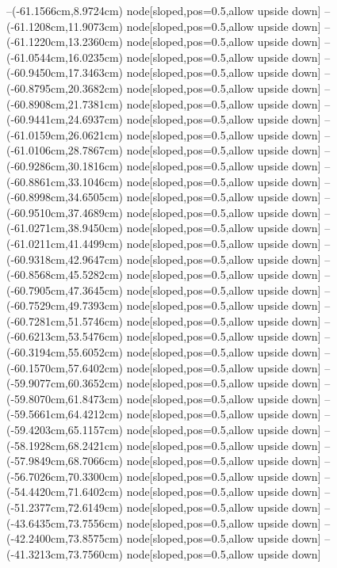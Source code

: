 --(-61.1566cm,8.9724cm) node[sloped,pos=0.5,allow upside down]{\ArrowIn}
--(-61.1208cm,11.9073cm) node[sloped,pos=0.5,allow upside down]{\ArrowIn}
--(-61.1220cm,13.2360cm) node[sloped,pos=0.5,allow upside down]{\ArrowIn}
--(-61.0544cm,16.0235cm) node[sloped,pos=0.5,allow upside down]{\ArrowIn}
--(-60.9450cm,17.3463cm) node[sloped,pos=0.5,allow upside down]{\ArrowIn}
--(-60.8795cm,20.3682cm) node[sloped,pos=0.5,allow upside down]{\ArrowIn}
--(-60.8908cm,21.7381cm) node[sloped,pos=0.5,allow upside down]{\ArrowIn}
--(-60.9441cm,24.6937cm) node[sloped,pos=0.5,allow upside down]{\ArrowIn}
--(-61.0159cm,26.0621cm) node[sloped,pos=0.5,allow upside down]{\ArrowIn}
--(-61.0106cm,28.7867cm) node[sloped,pos=0.5,allow upside down]{\ArrowIn}
--(-60.9286cm,30.1816cm) node[sloped,pos=0.5,allow upside down]{\ArrowIn}
--(-60.8861cm,33.1046cm) node[sloped,pos=0.5,allow upside down]{\ArrowIn}
--(-60.8998cm,34.6505cm) node[sloped,pos=0.5,allow upside down]{\ArrowIn}
--(-60.9510cm,37.4689cm) node[sloped,pos=0.5,allow upside down]{\ArrowIn}
--(-61.0271cm,38.9450cm) node[sloped,pos=0.5,allow upside down]{\ArrowIn}
--(-61.0211cm,41.4499cm) node[sloped,pos=0.5,allow upside down]{\ArrowIn}
--(-60.9318cm,42.9647cm) node[sloped,pos=0.5,allow upside down]{\ArrowIn}
--(-60.8568cm,45.5282cm) node[sloped,pos=0.5,allow upside down]{\ArrowIn}
--(-60.7905cm,47.3645cm) node[sloped,pos=0.5,allow upside down]{\ArrowIn}
--(-60.7529cm,49.7393cm) node[sloped,pos=0.5,allow upside down]{\ArrowIn}
--(-60.7281cm,51.5746cm) node[sloped,pos=0.5,allow upside down]{\ArrowIn}
--(-60.6213cm,53.5476cm) node[sloped,pos=0.5,allow upside down]{\ArrowIn}
--(-60.3194cm,55.6052cm) node[sloped,pos=0.5,allow upside down]{\ArrowIn}
--(-60.1570cm,57.6402cm) node[sloped,pos=0.5,allow upside down]{\ArrowIn}
--(-59.9077cm,60.3652cm) node[sloped,pos=0.5,allow upside down]{\ArrowIn}
--(-59.8070cm,61.8473cm) node[sloped,pos=0.5,allow upside down]{\ArrowIn}
--(-59.5661cm,64.4212cm) node[sloped,pos=0.5,allow upside down]{\ArrowIn}
--(-59.4203cm,65.1157cm) node[sloped,pos=0.5,allow upside down]{\arrowIn}
--(-58.1928cm,68.2421cm) node[sloped,pos=0.5,allow upside down]{\ArrowIn}
--(-57.9849cm,68.7066cm) node[sloped,pos=0.5,allow upside down]{\arrowIn}
--(-56.7026cm,70.3300cm) node[sloped,pos=0.5,allow upside down]{\ArrowIn}
--(-54.4420cm,71.6402cm) node[sloped,pos=0.5,allow upside down]{\ArrowIn}
--(-51.2377cm,72.6149cm) node[sloped,pos=0.5,allow upside down]{\ArrowIn}
--(-43.6435cm,73.7556cm) node[sloped,pos=0.5,allow upside down]{\ArrowIn}
--(-42.2400cm,73.8575cm) node[sloped,pos=0.5,allow upside down]{\ArrowIn}
--(-41.3213cm,73.7560cm) node[sloped,pos=0.5,allow upside down]{\arrowIn}
